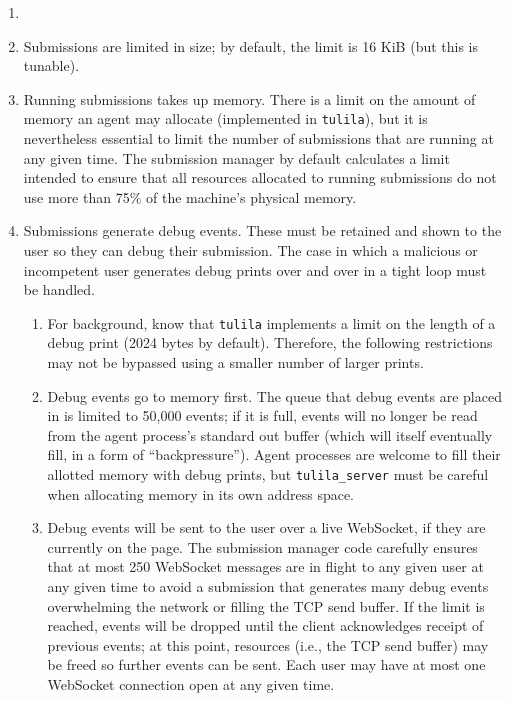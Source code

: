 \documentclass[12pt]{article}
\begin{document}
\begin{enumerate}
  \item {}
  \item Submissions are limited in size; by default, the limit is 16 KiB (but this is tunable).
  \item Running submissions takes up memory. There is a limit on the amount of memory an agent may allocate (implemented in \texttt{tulila}), but it is nevertheless essential to limit the number of submissions that are running at any given time. The submission manager by default calculates a limit intended to ensure that all resources allocated to running submissions do not use more than 75\% of the machine's physical memory.
  \item Submissions generate debug events. These must be retained and shown to the user so they can debug their submission. The case in which a malicious or incompetent user generates debug prints over and over in a tight loop must be handled.
  \begin{enumerate}
    \item For background, know that \texttt{tulila} implements a limit on the length of a debug print (2024 bytes by default). Therefore, the following restrictions may not be bypassed using a smaller number of larger prints.
    \item Debug events go to memory first. The queue that debug events are placed in is limited to 50,000 events; if it is full, events will no longer be read from the agent process's standard out buffer (which will itself eventually fill, in a form of ``backpressure''). Agent processes are welcome to fill their allotted memory with debug prints, but \texttt{tulila\_server} must be careful when allocating memory in its own address space.
    \item Debug events will be sent to the user over a live WebSocket, if they are currently on the page. The submission manager code carefully ensures that at most 250 WebSocket messages are in flight to any given user at any given time to avoid a submission that generates many debug events overwhelming the network or filling the TCP send buffer. If the limit is reached, events will be dropped until the client acknowledges receipt of previous events; at this point, resources (i.e., the TCP send buffer) may be freed so further events can be sent. Each user may have at most one WebSocket connection open at any given time.

\end{enumerate}
\end{enumerate}
\end{document}
